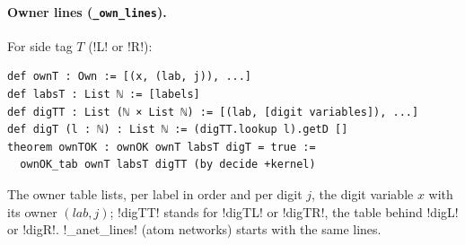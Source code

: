 {{{\paragraph{Owner lines (\texttt{\_own\_lines}).} For side tag $T$ (\lexcode!L! or \lexcode!R!):
\begin{lstlisting}[style=lexlean]
def ownT : Own := [(x, (lab, j)), ...]
def labsT : List ℕ := [labels]
def digTT : List (ℕ × List ℕ) := [(lab, [digit variables]), ...]
def digT (l : ℕ) : List ℕ := (digTT.lookup l).getD []
theorem ownTOK : ownOK ownT labsT digT = true :=
  ownOK_tab ownT labsT digTT (by decide +kernel)
\end{lstlisting}
The owner table lists, per label in order and per digit $j$, the digit variable $x$ with its
owner $(\mathit{lab}, j)$; \lexlean!digTT! stands for \lexlean!digTL! or \lexlean!digTR!, the
table behind \lexlean!digL! or \lexlean!digR!. \lexpy!_anet_lines! (atom networks) starts with the same lines.

}}}
